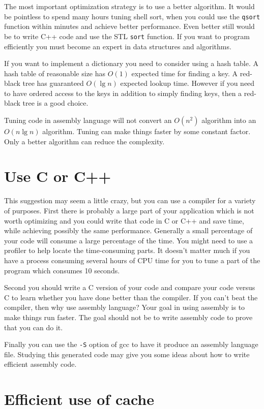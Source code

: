 \documentclass[11pt,b5paper]{book}
\begin{document}
The most important optimization strategy is to use a better algorithm.
It would be pointless to spend many hours tuning shell sort, when you could use the {\tt qsort} function within minutes and
achieve better performance.
Even better still would be to write C++ code and use the STL {\tt sort} function.
If you want to program efficiently you must become an expert in data structures and algorithms.

If you want to implement a dictionary you need to consider using a hash table.
A hash table of reasonable size has $O(1)$ expected time for finding a key.
A red-black tree has guaranteed $O(\lg n)$ expected lookup time.
However if you need to have ordered access to the keys in addition to simply
finding keys, then a red-black tree is a good choice.

Tuning code in assembly language will not convert an $O(n^2)$ algorithm into
an $O(n \lg n)$ algorithm.
Tuning can make things faster by some constant factor.
Only a better algorithm can reduce the complexity.

\section{Use C or C++}

This suggestion may seem a little crazy, but you can use a compiler for a variety of purposes.
First there is probably a large part of your application which is not worth optimizing and you could write
that code in C or C++ and save time, while achieving possibly the same performance.
Generally a small percentage of your code will consume a large percentage of
the time.
You might need to use a profiler to help locate the time-consuming parts.
It doesn't matter much if you have a process consuming several hours of CPU time
for you to tune a part of the program which consumes 10 seconds.

Second you should write a C version of your code and compare your code versus C to learn whether you have
done better than the compiler.
If you can't beat the compiler, then why use assembly language?
Your goal in using assembly is to make things run faster.
The goal should not be to write assembly code to prove that you can do it.

Finally you can use the {\tt -S} option of gcc to have it produce an assembly language file.
Studying this generated code may give you some ideas about how to write efficient assembly code.

\section{Efficient use of cache}
\end{document}
